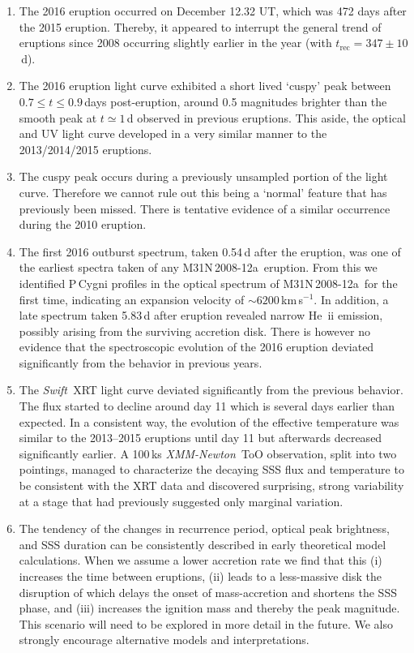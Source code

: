 \documentclass[twocolumn,tighten]{aastex6}
\def\swift{{\it Swift~}}
\def\xmm{{\it XMM-Newton~}}
\def\nova{{M31N\,2008-12a~}}
\begin{document}
\begin{enumerate}

\item The 2016 eruption occurred on December 12.32 UT, which was 472 days after the 2015 eruption. Thereby, it appeared to interrupt the general trend of eruptions since 2008 occurring slightly earlier in the year (with $t_\mathrm{rec} = 347\pm10$\,d).

\item The 2016 eruption light curve exhibited a short lived `cuspy' peak between $0.7\leq t \leq 0.9$\,days post-eruption, around 0.5 magnitudes brighter than the smooth peak at $t\simeq1$\,d observed in previous eruptions.  This aside, the optical and UV light curve developed in a very similar manner to the 2013/2014/2015 eruptions.

\item The cuspy peak occurs during a previously unsampled portion of the light curve.  Therefore we cannot rule out this being a `normal' feature that has previously been missed.  There is tentative evidence of a similar occurrence during the 2010 eruption.

\item The first 2016 outburst spectrum, taken 0.54\,d after the eruption, was one of the earliest spectra taken of any \nova eruption. From this we identified P\,Cygni profiles in the optical spectrum of \nova for the first time, indicating an expansion velocity of $\sim6200$\,km\,s$^{-1}$. In addition, a late spectrum taken 5.83\,d after eruption revealed narrow He~{\sc ii} emission, possibly arising from the surviving accretion disk. There is however no evidence that the spectroscopic evolution of the 2016 eruption deviated significantly from the behavior in previous years.

\item The \swift XRT light curve deviated significantly from the previous behavior. The flux started to decline around day 11 which is several days earlier than expected. In a consistent way, the evolution of the effective temperature was similar to the 2013--2015 eruptions until day 11 but afterwards decreased significantly earlier. A 100\,ks \xmm ToO observation, split into two pointings, managed to characterize the decaying SSS flux and temperature to be consistent with the XRT data and discovered surprising, strong variability at a stage that had previously suggested only marginal variation.

\item The tendency of the changes in recurrence period, optical peak brightness, and SSS duration can be consistently described in early theoretical model calculations. When we assume a lower accretion rate we find that this (i) increases the time between eruptions, (ii) leads to a less-massive disk the disruption of which delays the onset of mass-accretion and shortens the SSS phase, and (iii) increases the ignition mass and thereby the peak magnitude. This scenario will need to be explored in more detail in the future. We also strongly encourage alternative models and interpretations.

\end{enumerate}
\end{document}
